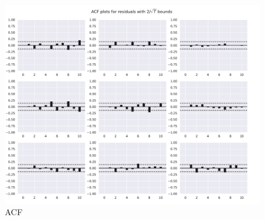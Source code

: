 \documentclass[cn]{homework}
\begin{document}
    \begin{figure}[h]
        \centering
        \includegraphics[width=\textwidth]{ACF}
        \caption{ACF}
        \label{fig:acf}
    \end{figure}
\end{document}
